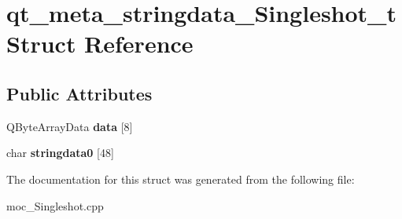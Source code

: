 \hypertarget{structqt__meta__stringdata__Singleshot__t}{}\section{qt\+\_\+meta\+\_\+stringdata\+\_\+\+Singleshot\+\_\+t Struct Reference}
\label{structqt__meta__stringdata__Singleshot__t}
\subsection*{Public Attributes}
\begin{DoxyCompactItemize}
\item 
Q\+Byte\+Array\+Data {\bfseries data} \mbox{[}8\mbox{]}\hypertarget{structqt__meta__stringdata__Singleshot__t_aa592dc0da73f0a73ba737378097654ea}{}\label{structqt__meta__stringdata__Singleshot__t_aa592dc0da73f0a73ba737378097654ea}

\item 
char {\bfseries stringdata0} \mbox{[}48\mbox{]}\hypertarget{structqt__meta__stringdata__Singleshot__t_adf8b3a73c6570b1603f01e3aed3e5df4}{}\label{structqt__meta__stringdata__Singleshot__t_adf8b3a73c6570b1603f01e3aed3e5df4}

\end{DoxyCompactItemize}


The documentation for this struct was generated from the following file\+:\begin{DoxyCompactItemize}
\item 
moc\+\_\+\+Singleshot.\+cpp\end{DoxyCompactItemize}
